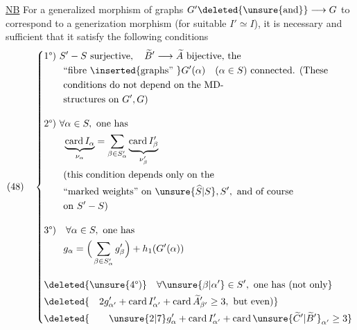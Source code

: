 \uline{NB} For a generalized morphism of graphs $G'\deleted{\unsure{\text{and}}}\longrightarrow G$ to correspond to a generization morphism (for suitable $I'\simeq I$), it is necessary and sufficient that it satisfy the following conditions
\[
(48)\quad\left\{\begin{aligned}
&\text{1°) }S'-S\text{ surjective},\quad\widetilde B'\longrightarrow\widetilde A\text{ bijective, the}\\
&\qquad\text{``fibre }\inserted{\text{graphs'' }}G'(\alpha)\quad(\alpha\in S)\text{ connected. (These}\\
&\qquad\text{conditions do not depend on the MD-}\\
&\qquad\text{structures on }G',G\text{)}\\[1em]
&\text{2°) }\forall\alpha\in S,\text{ one has}\\
&\qquad\underbrace{\operatorname{card}I_\alpha}_{\nu_\alpha}=\sum_{\beta\in S'_\alpha}\underbrace{\operatorname{card}I'_\beta}_{\nu'_\beta}\\
&\qquad\text{(this condition depends only on the}\\
&\qquad\text{``marked weights'' on }\unsure{\widehat S|S},S',\text{ and of course}\\
&\qquad\text{on }S'-S\text{)}\\[1em]
&\text{3°)}\quad\forall\alpha\in S,\text{ one has}\\
&\qquad g_\alpha=\Big(\sum_{\beta\in S'_\alpha}g'_\beta\Big)+h_1(G'(\alpha))\\[1em]
&\deleted{\unsure{\text{4°)}}\quad\forall\unsure{\beta|\alpha'}\in S',\text{ one has (not only}}\\
&\deleted{\quad2g'_{\alpha'}+\operatorname{card}I'_{\alpha'}+\operatorname{card}\widetilde A'_{\beta'}\geq3,\text{ but even)}}\\
&\deleted{\qquad\unsure{2|7}g'_{\alpha}+\operatorname{card}I'_{\alpha'}+\operatorname{card}\unsure{\widetilde C'|\widetilde B'}_{\alpha'}\geq3}
\end{aligned}\right.
\]
